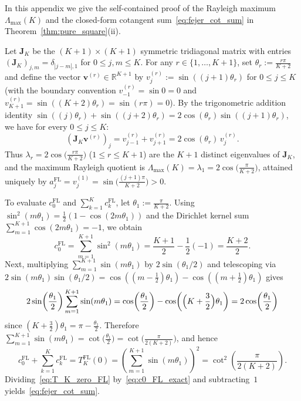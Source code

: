 \documentclass[11pt,reqno]{amsart}
\theoremstyle{definition}
\theoremstyle{remark}
\numberwithin{equation}{section}
\newcommand{\R}{\mathbb{R}}
\begin{document}
In this appendix we give the self-contained proof of the Rayleigh maximum $\Lambda_{\max}(K)$ and the closed-form cotangent sum~\eqref{eq:fejer_cot_sum} in Theorem~\ref{thm:pure_square}(ii).

Let $\mathbf{J}_K$ be the $(K+1) \times (K+1)$ symmetric tridiagonal matrix with entries $(\mathbf{J}_K)_{j,m} = \delta_{|j-m|,1}$ for $0 \le j,m \le K$. For any $r \in \{1, \dots, K+1\}$, set $\theta_r := \frac{r\pi}{K+2}$ and define the vector $\mathbf{v}^{(r)} \in \R^{K+1}$ by $v_j^{(r)} := \sin((j+1)\theta_r)$ for $0 \le j \le K$ (with the boundary convention $v_{-1}^{(r)} = \sin 0 = 0$ and $v_{K+1}^{(r)} = \sin((K+2)\theta_r) = \sin(r\pi) = 0$). By the trigonometric addition identity $\sin((j)\theta_r) + \sin((j+2)\theta_r) = 2\cos(\theta_r)\sin((j+1)\theta_r)$, we have for every $0 \le j \le K$:
\begin{equation}\label{eq:toeplitz_eig}
(\mathbf{J}_K \mathbf{v}^{(r)})_j = v_{j-1}^{(r)} + v_{j+1}^{(r)} = 2\cos(\theta_r)\,v_j^{(r)}.
\end{equation}
Thus $\lambda_r = 2\cos\bigl(\frac{r\pi}{K+2}\bigr)$ ($1 \le r \le K+1$) are the $K+1$ distinct eigenvalues of $\mathbf{J}_K$, and the maximum Rayleigh quotient is $\Lambda_{\max}(K) = \lambda_1 = 2\cos\bigl(\frac{\pi}{K+2}\bigr)$, attained uniquely by $a_j^{\mathrm{FL}} = v_j^{(1)} = \sin\bigl(\frac{(j+1)\pi}{K+2}\bigr) > 0$.

To evaluate $c_0^{\mathrm{FL}}$ and $\sum_{k=1}^K c_k^{\mathrm{FL}}$, let $\theta_1 := \frac{\pi}{K+2}$. Using $\sin^2(m\theta_1) = \frac{1}{2}(1 - \cos(2m\theta_1))$ and the Dirichlet kernel sum $\sum_{m=1}^{K+1} \cos(2m\theta_1) = -1$, we obtain
\begin{equation}\label{eq:c0_FL_exact}
c_0^{\mathrm{FL}} = \sum_{m=1}^{K+1} \sin^2(m\theta_1) = \frac{K+1}{2} - \frac{1}{2}(-1) = \frac{K+2}{2}.
\end{equation}
Next, multiplying $\sum_{m=1}^{K+1} \sin(m\theta_1)$ by $2\sin(\theta_1/2)$ and telescoping via $2\sin(m\theta_1)\sin(\theta_1/2) = \cos((m-\frac{1}{2})\theta_1) - \cos((m+\frac{1}{2})\theta_1)$ gives
\[
2\sin\!\left(\frac{\theta_1}{2}\right)\sum_{m=1}^{K+1} \sin(m\theta_1) = \cos\!\left(\frac{\theta_1}{2}\right) - \cos\!\left(\Bigl(K + \frac{3}{2}\Bigr)\theta_1\right) = 2\cos\!\left(\frac{\theta_1}{2}\right)
\]
since $(K + \frac{3}{2})\theta_1 = \pi - \frac{\theta_1}{2}$. Therefore $\sum_{m=1}^{K+1} \sin(m\theta_1) = \cot\bigl(\frac{\theta_1}{2}\bigr) = \cot\bigl(\frac{\pi}{2(K+2)}\bigr)$, and hence
\begin{equation}\label{eq:T_K_zero_FL}
c_0^{\mathrm{FL}} + \sum_{k=1}^K c_k^{\mathrm{FL}} = T_K^{\mathrm{FL}}(0) = \left(\sum_{m=1}^{K+1} \sin(m\theta_1)\right)^2 = \cot^2\!\left(\frac{\pi}{2(K+2)}\right).
\end{equation}
Dividing~\eqref{eq:T_K_zero_FL} by~\eqref{eq:c0_FL_exact} and subtracting~$1$ yields~\eqref{eq:fejer_cot_sum}.
\end{document}
